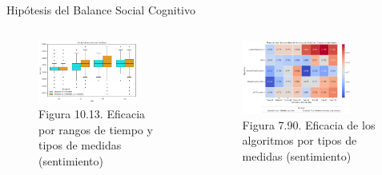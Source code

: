 \documentclass{beamer}
\begin{document}
\begin{frame}
\begin{block}{Hipótesis del Balance Social Cognitivo}
	\end{block}	
	\begin{columns}[c]
		\begin{column}{.5\textwidth}
			\begin{figure}
				\centering
				\includegraphics[width=0.8\textwidth]{figs/cap7/figura_48}
				\caption{Figura 10.13. Eficacia por rangos de tiempo y tipos de medidas (sentimiento)}
			\end{figure}      
		\end{column}
		\begin{column}{.5\textwidth}
			\begin{figure}
				\centering
				\includegraphics[width=0.8\textwidth]{figs/cap7/figura_111}
				\caption{Figura 7.90. Eficacia de los algoritmos por tipos de medidas (sentimiento)}
			\end{figure}
		\end{column}
	\end{columns}	
\end{frame}
\end{document}
